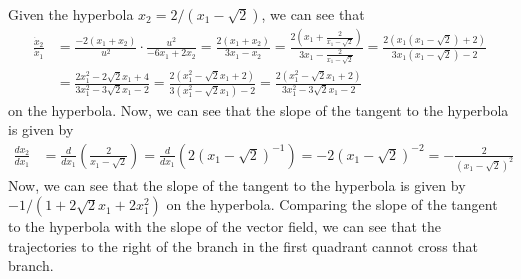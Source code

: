 Given the hyperbola \( x_2 = 2 / (x_1 - \sqrt{2}) \), we can see that
\begin{align*}
    \frac{\dot{x}_2}{\dot{x}_1}
     & =
    \frac{-2 (x_1 + x_2)}{u^2} \cdot \frac{u^2}{-6 x_1 + 2 x_2}
    =
    \frac{2 (x_1 + x_2)}{3 x_1 - x_2}
    =
    \frac{2 \left( x_1 + \frac{2}{x_1 - \sqrt{2}} \right)}{3 x_1 - \frac{2}{x_1 - \sqrt{2}}}
    =
    \frac{2 \left( x_1 (x_1 - \sqrt{2}) + 2 \right)}{3 x_1 (x_1 - \sqrt{2}) - 2}
    \\ & =
    \frac{2 x_1^2 - 2 \sqrt{2} x_1 + 4}{3 x_1^2 - 3 \sqrt{2} x_1 - 2}
    =
    \frac{2 (x_1^2 - \sqrt{2} x_1 + 2)}{3 (x_1^2 - \sqrt{2} x_1) - 2}
    =
    \frac{2 (x_1^2 - \sqrt{2} x_1 + 2)}{3 x_1^2 - 3 \sqrt{2} x_1 - 2}
\end{align*}
on the hyperbola.
Now, we can see that the slope of the tangent to the hyperbola is given by
\begin{align*}
    \frac{d x_2}{d x_1}
     & =
    \frac{d}{d x_1} \left( \frac{2}{x_1 - \sqrt{2}} \right)
    =
    \frac{d}{d x_1} \left( 2 (x_1 - \sqrt{2})^{-1} \right)
    =
    -2 (x_1 - \sqrt{2})^{-2}
    =
    -\frac{2}{(x_1 - \sqrt{2})^2}
\end{align*}
Now, we can see that the slope of the tangent to the hyperbola is given by \( -1 / (1 + 2 \sqrt{2} x_1 + 2 x_1^2) \) on the hyperbola.
Comparing the slope of the tangent to the hyperbola with the slope of the vector field, we can see that the trajectories to the right of the branch in the first quadrant cannot cross that branch.
